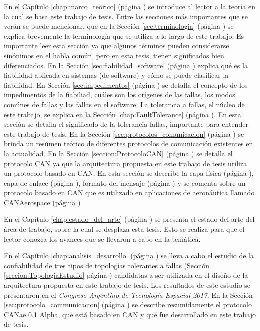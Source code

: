 En el Capítulo \ref{chap:marco_teorico} (página \pageref{chap:marco_teorico})
se introduce al lector a la teoría en la cual se basa este trabajo de tesis. Entre
las secciones más importantes que se verán se puede mencionar, que en la
Sección \ref{sec:terminologia} (página \pageref{sec:terminologia}) se explica brevemente la
terminología que se utiliza a lo largo de este trabajo. Es importante leer esta sección ya que
algunos términos pueden considerarse sinónimos en el habla común, pero en esta tesis, tienen
significados bien diferenciados.
En la Sección \ref{sec:fiabilidad_software} (página \pageref{sec:fiabilidad_software}) explica
qué es la fiabilidad aplicada en sistemas (de software) y cómo se puede clasificar la fiabilidad. En
Sección \ref{sec:impedimentos} (página \pageref{sec:impedimentos}) se detalla el concepto de los
impedimentos de la fiabiliad, cuáles son los orígenes de las fallas, los modos comúnes de fallas
y las fallas en el software.
La tolerancia a fallas, el núcleo de este trabajo, se explica en la Sección \ref{chap:FaultTolerance}
(página \pageref{chap:FaultTolerance}). En esta sección se detalla el significado de la tolerancia
fallas, importante para entender este trabajo de tesis.
En la Sección \ref{sec:protocolos_comunicacion} (página \pageref{sec:protocolos_comunicacion})
se brinda un resúmen teórico de diferentes protocolos de comunicación existentes en la actualidad.
En la Sección \ref{seccion:ProtocoloCAN} (página \pageref{seccion:ProtocoloCAN}) se detalla el
protocolo CAN ya que la arquitectura propuesta
en este trabajo de tesis utiliza un protocolo  basado en CAN. En esta sección se describe la capa física (página \pageref{subsec:capafisca}), capa de enlace (página \pageref{subsec:capa_enlace}), formato del mensaje (página \pageref{subsec:formato_mensaje}) y se comenta sobre un protocolo basado en CAN que es utilizado en aplicaciones de aeronáutica llamado CANAerospace (página \pageref{subsec:CANaerospace})

En el Capítulo \ref{chap:estado_del_arte} (página \pageref{chap:estado_del_arte}) se presenta el
estado del arte del área de trabajo, sobre la cual se desplaza esta tesis. Esto se realiza para que
el lector conozca los avances que se llevaron a cabo en la temática.

En el Capítulo \ref{chap:analisis_desarrollo} (página \pageref{chap:analisis_desarrollo}) se lleva
a cabo el estudio de la confiabilidad de tres tipos de topologías tolerantes a fallas (Sección \ref{seccion:TopologiaEstudio} página \pageref{seccion:TopologiaEstudio}) candidatas a ser utilizada en el
diseño de la arquitectura propuesta en este trabajo de tesis. Los resultados de este estudio
se presentaron en el \textit{Congreso Argentino de Tecnología Espacial 2017}. En la Sección \ref{sec:protocolo_communicacion} (página \pageref{sec:protocolo_communicacion})
se describe resumídamente el protocolo CANae 0.1 Alpha, que está basado en CAN y
que fue desarrollado en este trabajo de tesis.

